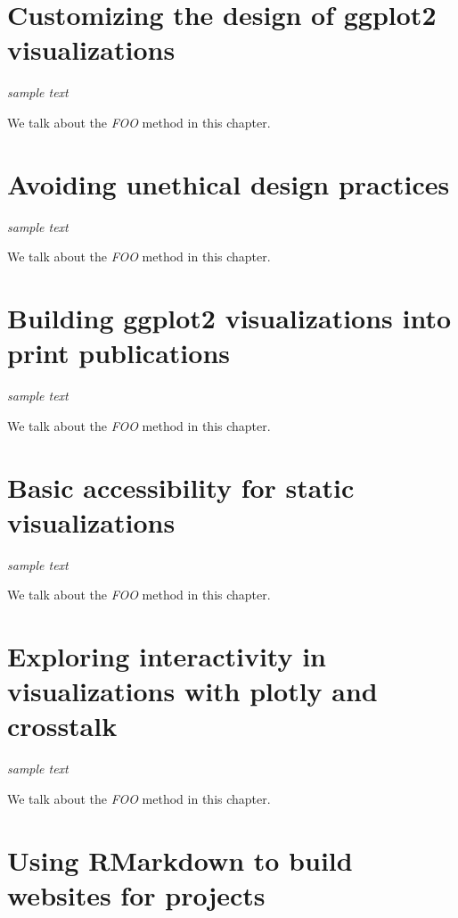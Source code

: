 \documentclass[
]{krantz}
\begin{document}
\hypertarget{customizing-visualization-design}{%
\chapter{Customizing the design of ggplot2 visualizations}\label{customizing-visualization-design}}

\emph{sample text}

We talk about the \emph{FOO} method in this chapter.

\hypertarget{ethical-design-practices}{%
\chapter{Avoiding unethical design practices}\label{ethical-design-practices}}

\emph{sample text}

We talk about the \emph{FOO} method in this chapter.

\hypertarget{print-publications}{%
\chapter{Building ggplot2 visualizations into print publications}\label{print-publications}}

\emph{sample text}

We talk about the \emph{FOO} method in this chapter.

\hypertarget{accessibility-for-visualizations}{%
\chapter{Basic accessibility for static visualizations}\label{accessibility-for-visualizations}}

\emph{sample text}

We talk about the \emph{FOO} method in this chapter.

\hypertarget{interactive-visualizations}{%
\chapter{Exploring interactivity in visualizations with plotly and crosstalk}\label{interactive-visualizations}}

\emph{sample text}

We talk about the \emph{FOO} method in this chapter.

\hypertarget{rmarkdown-websites}{%
\chapter{Using RMarkdown to build websites for projects}\label{rmarkdown-websites}}
\end{document}
